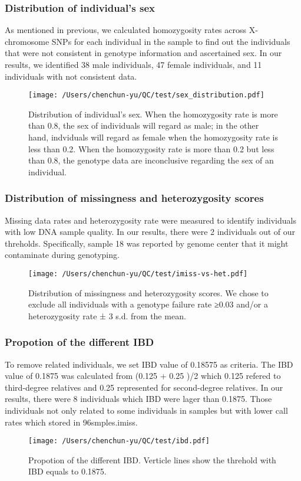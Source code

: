 \documentclass{article}\usepackage[]{graphicx}\usepackage[]{color}
\begin{document}
\subsubsection{Distribution of individual's sex}
As mentioned in previous, we calculated homozygosity rates across X-chromosome SNPs for each individual in the sample to find out the individuals that were not consistent in genotype information and ascertained sex. In our results, we identified 38 male individuals, 47 female individuals, and 11 individuals with not consistent data.
\begin{figure}[h]
\texttt{[image: /Users/chenchun-yu/QC/test/sex\_distribution.pdf]}
\centering
\caption{Distribution of individual's sex. When the homozygosity rate is more than 0.8, the sex of individuals will regard as male; in the other hand, indviduals will regard as female when the homozygosity rate is less than 0.2. When the homozygosity rate is more than 0.2 but less than 0.8, the genotype data are inconclusive regarding the sex of an individual.}
\end{figure}
\newpage


\subsubsection{Distribution of missingness and heterozygosity scores}
Missing data rates and heterozygosity rate were measured to identify individuals with low DNA sample quality. In our results, there were 2 individuals out of our threholds. Specifically, sample 18 was reported by genome center that it might contaminate during genotyping.
\begin{figure}[h]
\texttt{[image: /Users/chenchun-yu/QC/test/imiss-vs-het.pdf]}
\centering
\caption{Distribution of missingness and heterozygosity scores. We chose to exclude all individuals with a genotype failure rate ≥0.03 and/or a heterozygosity rate ± 3 s.d. from the mean.}
\end{figure}
\newpage

\subsubsection{Propotion of the different IBD}
To remove related individuals, we set IBD value of 0.18575 as criteria. The IBD value of 0.1875 was calculated from (0.125 + 0.25 )/2 which 0.125 refered to third-degree relatives and 0.25 represented for second-degree relatives. In our results, there were 8 individuals which IBD were lager than 0.1875. Those individuals not only related to some individuals in samples but with lower call rates which stored in 96smples.imiss.
\begin{figure}[h]
\texttt{[image: /Users/chenchun-yu/QC/test/ibd.pdf]}
\centering
\caption{Propotion of the different IBD. Verticle lines show the threhold with IBD equals to 0.1875.}
\end{figure}
\newpage

\end{document}
